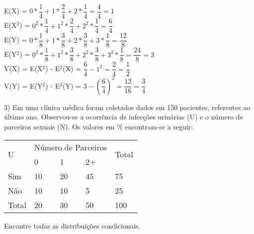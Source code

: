 \documentclass[12pt,a4paper,draft]{article}
\begin{document}
	\begin{center}
		E(X) = $0 * \dfrac{1}{4} + 1 * \dfrac{2}{4} + 2 * \dfrac{1}{4} = \dfrac{4}{4} = 1$
		\vspace{1cm}\\
		E(X$^2$) = $0^2 * \dfrac{1}{4} + 1^2 * \dfrac{2}{4} + 2^2 * \dfrac{1}{4} = \dfrac{6}{4}$
		\vspace{1cm}\\
		E(Y) = $0 * \dfrac{1}{8} + 1 * \dfrac{3}{8} + 2 * \dfrac{3}{8} + 3 * \dfrac{1}{8} = \dfrac{12}{8}$
		\vspace{1cm}\\
		E(Y$^2$) = $0^2 * \dfrac{1}{8} + 1^2 * \dfrac{3}{8} + 2^2 * \dfrac{3}{8} + 3^2 * \dfrac{1}{8} = \dfrac{24}{8} = 3$
		\vspace{1cm}\\
		V(X) = E(X$^2$) - E$^2$(X) = $\dfrac{6}{4} - 1^2 = \dfrac{2}{4} = \dfrac{1}{2}$
		\vspace{1cm}\\
		V(Y) = E(Y$^2$) - E$^2$(Y) = $3 - \left(\dfrac{6}{4}\right)^2 = \dfrac{12}{16} = \dfrac{3}{4}$
	\end{center}
	\vspace{1cm}
	3) Em uma clínica médica foram coletados dados em 150 pacientes, referentes ao último ano. Observou-se a ocorrência de infecções urinárias (U) e o número de parceiros sexuais (N). Os valores em \% encontram-se a seguir:\\
	\begin{center}
		\begin{tabular}{|l|l|l|l|l|}\hline
		\multirow{2}{*}{U} & \multicolumn{3}{l|}{Número de Parceiros} & \multirow{2}{*}{Total}\\ \cline{2-4}
		& 0 & 1 & 2+ & \\ \hline
		Sim & 10 & 20 & 45 & 75\\ \hline
		Não & 10 & 10 & 5 & 25\\ \hline
		Total & 20 & 30 & 50 & 100\\ \hline
		\end{tabular}
	\end{center}
	\vspace{0.5cm}
	Encontre todas as distribuições condicionais.
	\vspace{1cm}
\end{document}

